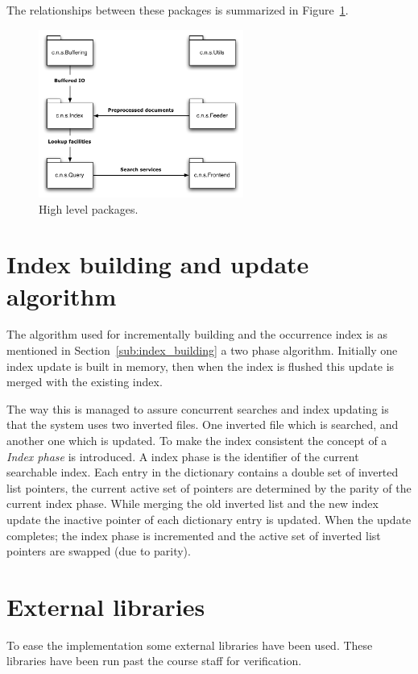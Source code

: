 The relationships between these packages is summarized in Figure~\ref{fig:high_level_packages}. 

\begin{figure}[ht]
	\centering
	\includegraphics[width=0.6\textwidth]{include/packages.pdf}
	\caption{High level packages.}\label{fig:high_level_packages}
\end{figure}

\section{Index building and update algorithm}
The algorithm used for incrementally building and the occurrence index is as mentioned in Section~\ref{sub:index_building} a two phase algorithm. Initially one index update is built in memory, then when the index is flushed this update is merged with the existing index. 

The way this is managed to assure concurrent searches and index updating is that the system uses  two inverted files. One inverted file which is searched, and another one which is updated. To make the index consistent the concept of a \emph{Index phase} is introduced. A index phase is the identifier of the current searchable index. Each entry in the dictionary contains a double set of inverted list pointers, the current active set of pointers are determined by the parity of the current index phase. While merging the old inverted list and the new index update the inactive pointer of each dictionary entry is updated. When the update completes; the index phase is incremented and the active set of inverted list pointers are swapped (due to parity). 

\section{External libraries}\label{sec:external_libraries}
To ease the implementation some external libraries have been used. These libraries have been run past the course staff for verification.

